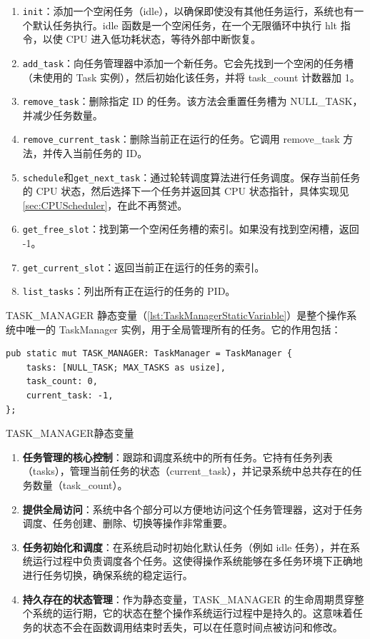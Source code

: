 \begin{enumerate}
    \item \texttt{init}：添加一个空闲任务（idle），以确保即使没有其他任务运行，系统也有一个默认任务执行。idle 函数是一个空闲任务，在一个无限循环中执行 hlt 指令，以使 CPU 进入低功耗状态，等待外部中断恢复。
    \item \texttt{add\_task}：向任务管理器中添加一个新任务。它会先找到一个空闲的任务槽（未使用的 Task 实例），然后初始化该任务，并将 task\_count 计数器加 1。
    \item \texttt{remove\_task}：删除指定 ID 的任务。该方法会重置任务槽为 NULL\_TASK，并减少任务数量。
    \item \texttt{remove\_current\_task}：删除当前正在运行的任务。它调用 remove\_task 方法，并传入当前任务的 ID。
    \item \texttt{schedule}和\texttt{get\_next\_task}：通过轮转调度算法进行任务调度。保存当前任务的 CPU 状态，然后选择下一个任务并返回其 CPU 状态指针，具体实现见\cref{sec:CPUScheduler}，在此不再赘述。
    \item \texttt{get\_free\_slot}：找到第一个空闲任务槽的索引。如果没有找到空闲槽，返回 -1。
    \item \texttt{get\_current\_slot}：返回当前正在运行的任务的索引。
    \item \texttt{list\_tasks}：列出所有正在运行的任务的 PID。
\end{enumerate}

TASK\_MANAGER 静态变量（\cref{lst:TaskManagerStaticVariable}）是整个操作系统中唯一的 TaskManager 实例，用于全局管理所有的任务。它的作用包括：

\begin{listing}[htbp]
    \begin{verbatim}
pub static mut TASK_MANAGER: TaskManager = TaskManager {
    tasks: [NULL_TASK; MAX_TASKS as usize],
    task_count: 0,
    current_task: -1,
};
    \end{verbatim}
    \caption{TASK\_MANAGER静态变量}\label{lst:TaskManagerStaticVariable}
\end{listing}

\begin{enumerate}
    \item \textbf{任务管理的核心控制}：跟踪和调度系统中的所有任务。它持有任务列表（tasks），管理当前任务的状态（current\_task），并记录系统中总共存在的任务数量（task\_count）。
    \item \textbf{提供全局访问}：系统中各个部分可以方便地访问这个任务管理器，这对于任务调度、任务创建、删除、切换等操作非常重要。
    \item \textbf{任务初始化和调度}：在系统启动时初始化默认任务（例如 idle 任务），并在系统运行过程中负责调度各个任务。这使得操作系统能够在多任务环境下正确地进行任务切换，确保系统的稳定运行。
    \item \textbf{持久存在的状态管理}：作为静态变量，TASK\_MANAGER 的生命周期贯穿整个系统的运行期，它的状态在整个操作系统运行过程中是持久的。这意味着任务的状态不会在函数调用结束时丢失，可以在任意时间点被访问和修改。
\end{enumerate}

